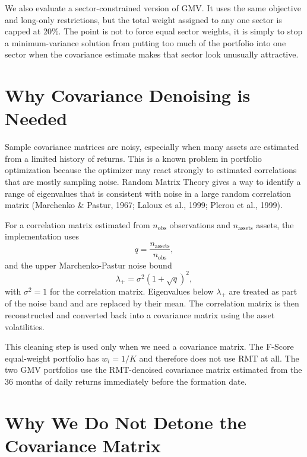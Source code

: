\documentclass[11pt,a4paper]{report}
\numberwithin{figure}{chapter}
\numberwithin{table}{chapter}
\numberwithin{equation}{chapter}
\begin{document}
We also evaluate a sector-constrained version of GMV. It uses the same objective and long-only restrictions, but the total weight assigned to any one sector is capped at 20\%. The point is not to force equal sector weights, it is simply to stop a minimum-variance solution from putting too much of the portfolio into one sector when the covariance estimate makes that sector look unusually attractive.

\section{Why Covariance Denoising is Needed}

Sample covariance matrices are noisy, especially when many assets are estimated from a limited history of returns. This is a known problem in portfolio optimization because the optimizer may react strongly to estimated correlations that are mostly sampling noise. Random Matrix Theory gives a way to identify a range of eigenvalues that is consistent with noise in a large random correlation matrix (Marchenko \& Pastur, 1967; Laloux et al., 1999; Plerou et al., 1999).

For a correlation matrix estimated from $n_{\mathrm{obs}}$ observations and $n_{\mathrm{assets}}$ assets, the implementation uses
\begin{equation}
q = \frac{n_{\mathrm{assets}}}{n_{\mathrm{obs}}},
\end{equation}
and the upper Marchenko-Pastur noise bound
\begin{equation}
\lambda_{+} = \sigma^2\left(1+\sqrt{q}\right)^2,
\label{eq:mp_bound}
\end{equation}
with $\sigma^2=1$ for the correlation matrix. Eigenvalues below $\lambda_{+}$ are treated as part of the noise band and are replaced by their mean. The correlation matrix is then reconstructed and converted back into a covariance matrix using the asset volatilities.

This cleaning step is used only when we need a covariance matrix. The F-Score equal-weight portfolio has $w_i=1/K$ and therefore does not use RMT at all. The two GMV portfolios use the RMT-denoised covariance matrix estimated from the 36 months of daily returns immediately before the formation date.

\section{Why We Do Not Detone the Covariance Matrix}
\label{sec:detoning}
\end{document}
